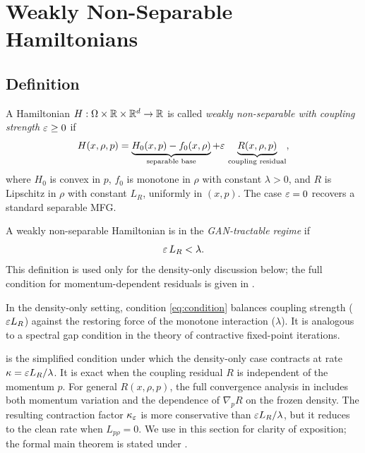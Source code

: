 \section{Weakly Non-Separable Hamiltonians}
\label{sec:weak}

\subsection{Definition}

\begin{definition}
\label{def:weak_nonsep}
A Hamiltonian $H : \Omega \times \mathbb{R} \times \mathbb{R}^d \to \mathbb{R}$ is called
\emph{weakly non-separable with coupling strength $\varepsilon \geq 0$} if
\begin{equation}\label{eq:decomp}
  H(x,\rho,p) = \underbrace{H_0(x,p) - f_0(x,\rho)}_{\text{separable base}}
  + \varepsilon\, \underbrace{R(x,\rho,p)}_{\text{coupling residual}},
\end{equation}
where $H_0$ is convex in $p$, $f_0$ is monotone in $\rho$ with constant
$\lambda > 0$, and $R$ is Lipschitz in $\rho$ with constant $L_R$,
uniformly in $(x,p)$.
The case $\varepsilon = 0$ recovers a standard separable MFG.
\end{definition}

\begin{definition}
\label{def:tractable}
A weakly non-separable Hamiltonian is in the \emph{GAN-tractable regime} if
\begin{equation}\label{eq:condition}
  \varepsilon\, L_R < \lambda.
\end{equation}
This definition is used only for the density-only discussion below; the full
condition for momentum-dependent residuals is given in .
\end{definition}

\begin{remark}
In the density-only setting, condition \eqref{eq:condition} balances coupling
strength ($\varepsilon L_R$) against the restoring force of the monotone interaction
($\lambda$). It is analogous to a spectral gap condition in the theory of
contractive fixed-point iterations.
\end{remark}

\begin{remark}
\label{rem:two_versions}
 is the simplified condition under which the density-only
case contracts at rate $\kappa = \varepsilon L_R/\lambda$.
It is exact when the coupling residual $R$ is independent of the momentum $p$.
For general $R(x,\rho,p)$, the full convergence analysis in
 includes both momentum variation and the dependence of
$\nabla_pR$ on the frozen density.  The resulting contraction factor
$\kappa_\varepsilon$ is more conservative than $\varepsilon L_R/\lambda$, but it reduces to
the clean rate when $L_{p\rho}=0$.
We use  in this section for clarity of exposition;
the formal main theorem is stated under .
\end{remark}

